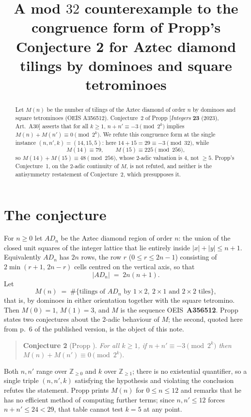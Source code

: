 \documentclass[11pt]{amsart}
\title[A mod $32$ counterexample to Propp's Conjecture 2, congruence form]
{A mod $32$ counterexample to the congruence form of Propp's Conjecture 2
for Aztec diamond tilings by dominoes and square tetrominoes}
\date{}
\begin{document}
\begin{abstract}
Let $M(n)$ be the number of tilings of the Aztec diamond of order $n$ by
dominoes and square tetrominoes (OEIS A356512). Conjecture~2 of Propp
[\emph{Integers} \textbf{23} (2023), Art.~A30] asserts that for all $k\ge1$,
$n+n'\equiv-3 \pmod{2^k}$ implies $M(n)+M(n')\equiv0 \pmod{2^k}$. We refute this congruence form
at the single instance $(n,n',k)=(14,15,5)$: here $14+15=29\equiv-3
\pmod{32}$, while
\[
  M(14)\equiv 79,\qquad M(15)\equiv 225 \pmod{256},
\]
so $M(14)+M(15)\equiv48\pmod{256}$, whose $2$-adic valuation is $4$, not
$\ge5$. Propp's Conjecture~1, on the $2$-adic continuity of $M$, is not
refuted, and neither is the antisymmetry restatement of Conjecture~2, which
presupposes it.
\end{abstract}

\maketitle

\section{The conjecture}\label{sec:conj}

For $n\ge0$ let $AD_n$ be the Aztec diamond region of order $n$: the union of
the closed unit squares of the integer lattice that lie entirely inside
$|x|+|y|\le n+1$. Equivalently $AD_n$ has $2n$ rows, the row $r$
($0\le r\le 2n-1$) consisting of $2\min(r+1,\,2n-r)$ cells centred on the
vertical axis, so that
\begin{equation}\label{eq:cells}
  |AD_n| \;=\; 2n(n+1).
\end{equation}
Let
\[
  M(n) \;=\; \#\bigl\{\text{tilings of } AD_n \text{ by } 1\times2,\ 2\times1
  \text{ and } 2\times2 \text{ tiles}\bigr\},
\]
that is, by dominoes in either orientation together with the square
tetromino. Then $M(0)=1$, $M(1)=3$, and $M$ is the sequence
OEIS~\textbf{A356512}. Propp \cite{Propp} states two conjectures about the
$2$-adic behaviour of $M$; the second, quoted here from p.~6 of the published
version, is the object of this note.

\begin{quote}
\textbf{Conjecture 2} (Propp \cite{Propp}). \emph{For all $k\ge1$, if
$n+n'\equiv-3 \pmod{2^k}$ then $M(n)+M(n')\equiv0 \pmod{2^k}$.}
\end{quote}

Both $n,n'$ range over $\mathbb{Z}_{\ge0}$ and $k$ over $\mathbb{Z}_{\ge1}$;
there is no existential quantifier, so a single triple $(n,n',k)$ satisfying
the hypothesis and violating the conclusion refutes the statement. Propp
prints $M(n)$ for $0\le n\le12$ and remarks that he has no efficient method of
computing further terms; since $n,n'\le12$ forces $n+n'\le24<29$, that table
cannot test $k=5$ at any point.
\end{document}
